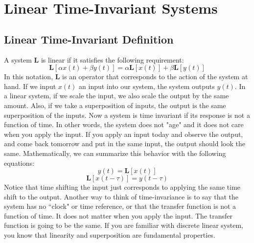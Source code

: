 \section{Linear Time-Invariant Systems}
\subsection{Linear Time-Invariant Definition}
A system $\mathbf{L}$ is linear if it satisfies the following requirement:
    \begin{equation}
        \mathbf{L} [ \alpha x(t) + \beta y(t) ] = \alpha \mathbf{L}[ x(t) ] + \beta \mathbf{L}[ y(t) ]
    \end{equation}
In this notation, $\mathbf{L}$ is an operator that corresponds to the action of the system at hand. If we input $x(t)$ an input into our system, the system outputs $y(t)$.  In a linear system, if we scale the input, we also scale the output by the same amount. Also, if we take a superposition of inputs, the output is the same superposition of the inputs.
Now a system is time invariant if its response is not a function of time. In other words, the system does not "age" and it does not care when you apply the input.  If you apply an input today and observe the output, and come back tomorrow and put in the same input, the output should look the same.  Mathematically, we can summarize this behavior with the following equations:
    \begin{equation}
        y(t) = \mathbf{L} [  x(t)  ]
    \end{equation}
    \begin{equation}
        \mathbf{L} [  x(t-\tau)  ] = y(t-\tau)
    \end{equation}
Notice that time shifting the input just corresponds to applying the same time shift to the output.  Another way to think of time-invariance is to say that the system has no  ``clock" or time reference, or that the transfer function is not a function of time.  It does not matter when you apply the input.  The transfer function is going to be the same. 
 If you are familiar with discrete linear system, you know that linearity and superposition are fundamental properties. 
